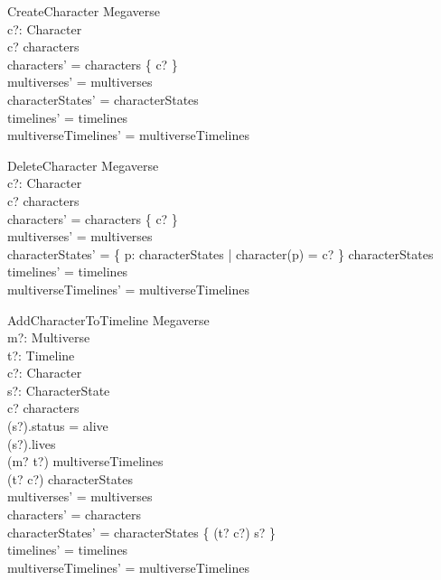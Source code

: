 \documentclass{article}
\begin{document}
\begin{schema}{CreateCharacter}
\Delta Megaverse \\
c?: Character \\
\where 
c? \notin characters \\
characters' = characters \cup \{ c? \} \\
multiverses' = multiverses \\
characterStates' = characterStates \\
timelines' = timelines \\
multiverseTimelines' = multiverseTimelines \\
\end{schema}

\begin{schema}{DeleteCharacter}
\Delta Megaverse \\
c?: Character \\
\where 
c? \in characters \\
characters' = characters \setminus \{ c? \} \\
multiverses' = multiverses \\
characterStates' = \{ p: \dom characterStates | character(p) = c? \} \ndres characterStates \\
timelines' = timelines \\
multiverseTimelines' = multiverseTimelines \\
\end{schema}

\begin{schema}{AddCharacterToTimeline}
\Delta Megaverse \\
m?: Multiverse \\
t?: Timeline \\
c?: Character \\
s?: CharacterState \\ 
\where
c? \in characters \\
(s?).status = alive \\
(s?).lives  \\
(m? \mapsto t?) \in multiverseTimelines \\
(t? \mapsto c?) \notin \dom characterStates  \\
multiverses' = multiverses \\
characters' = characters \\
characterStates' = characterStates \cup \{ (t? \mapsto c?) \mapsto s? \} \\ 
timelines' = timelines \\
multiverseTimelines' = multiverseTimelines \\
\end{schema}
\end{document}
